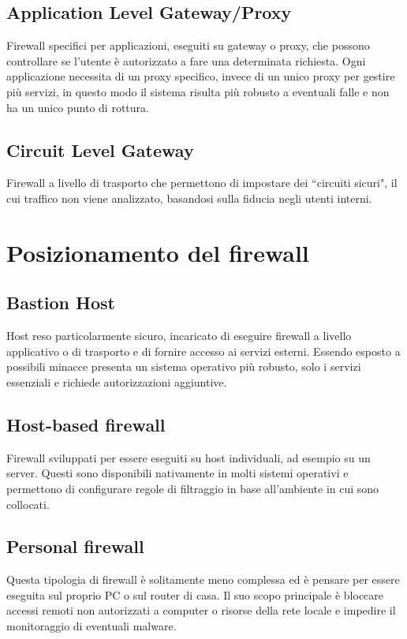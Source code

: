 \documentclass[a4paper, 11pt, notitlepage, fleqn]{report}
\begin{document}
\subsection{Application Level Gateway/Proxy}
Firewall specifici per applicazioni, eseguiti su gateway o proxy, che possono controllare se l'utente è autorizzato a fare una determinata richiesta. Ogni applicazione necessita di un proxy specifico, invece di un unico proxy per gestire più servizi, in questo modo il sistema risulta più robusto a eventuali falle e non ha un unico punto di rottura.

\subsection{Circuit Level Gateway}
Firewall a livello di trasporto che permettono di impostare dei ``circuiti sicuri", il cui traffico non viene analizzato, basandosi sulla fiducia negli utenti interni.

\section{Posizionamento del firewall}
\subsection{Bastion Host}
Host reso particolarmente sicuro, incaricato di eseguire firewall a livello applicativo o di trasporto e di fornire accesso ai servizi esterni. Essendo esposto a possibili minacce presenta un sistema operativo più robusto, solo i servizi essenziali e richiede autorizzazioni aggiuntive.

\subsection{Host-based firewall}
Firewall sviluppati per essere eseguiti su host individuali, ad esempio su un server. Questi sono disponibili nativamente in molti sistemi operativi e permettono di configurare regole di filtraggio in base all'ambiente in cui sono collocati.

\subsection{Personal firewall}
Questa tipologia di firewall è solitamente meno complessa ed è pensare per essere eseguita sul proprio PC o sul router di casa. Il suo scopo principale è bloccare accessi remoti non autorizzati a computer o risorse della rete locale e impedire il monitoraggio di eventuali malware.
\end{document}

